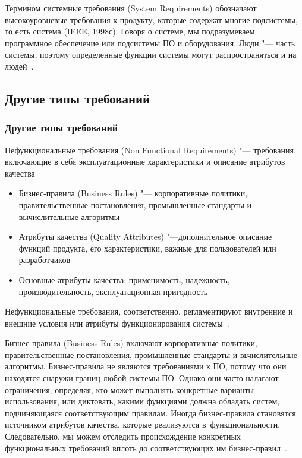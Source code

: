 \documentclass{../industrial-development}
\begin{document}
Термином \alert{системные требования (System Requirements)} обозначают высокоуровневые требования к продукту, которые содержат многие подсистемы, то есть система (IEEE, 1998с). Говоря о системе, мы подразумеваем программное обеспечение или подсистемы ПО и оборудования. Люди "--- часть системы, поэтому определенные функции системы могут распространяться и на людей~\cite[с.~9]{Wiegers}.


\subsection{Другие типы требований}
\begin{frame} \frametitle{Другие типы требований}
  \begin{block}{}
\alert{Нефункциональные требования} (Non Functional Requirements) "--- требования, включающие в себя эксплуатационные характеристики и описание атрибутов качества
  \end{block}
	\begin{itemize}
\item \alert{Бизнес-правила} (Business Rules) "--- корпоративные политики, правительственные постановления, промышленные стандарты и вычислительные алгоритмы
\item \alert{Атрибуты качества} (Quality Attributes) "---дополнительное описание функций продукта, его характеристики, важные для пользователей или разработчиков

\item Основные атрибуты качества: применимость,  надежность, производительность, эксплуатационная пригодность

	\end{itemize}
		\end{frame}
		
\lecturenotes

Нефункциональные требования, соответственно, регламентируют внутренние и внешние условия или атрибуты функционирования системы~\cite[с.~10]{Maglinec}.

\alert{Бизнес-правила (Business Rules)} включают корпоративные политики, правительственные постановления, промышленные стандарты и вьчислительные алгоритмы. Бизнес-правила не являются требованиями к ПО, потому что они находятся снаружи границ любой системы ПО. Однако они часто налагают ограничения, определяя, кто может выполнять конкретные варианты использования, или диктовать, какими функциями должна обладать систем, подчиняющаяся соответствующим правилам. Иногда бизнес-правила становятся источником атрибутов качества, которые реализуются в~функциональности. Следовательно, мы можем отследить происхождение конкретных функциональных требований вплоть до соответствующих им бизнес-правил~\cite[с.~9]{Wiegers}.
\end{document}
